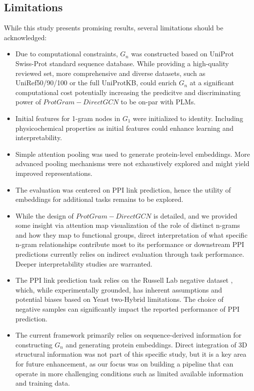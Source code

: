 \documentclass[utf8]{FrontiersinHarvard}
\begin{document}
	\subsection{Limitations}
	While this study presents promising results, several limitations should be acknowledged:
	\begin{itemize}
		\item Due to computational constraints, $G_{n}$ was constructed based on UniProt Swiss-Prot standard sequence database. While providing a high-quality reviewed set, more comprehensive and diverse datasets, such as UniRef50/90/100 or the full UniProtKB, could enrich $G_{n}$ at a significant computational cost potentially increasing the predicitve and discriminating power of $ProtGram-DirectGCN$ to be on-par with PLMs.
		\item Initial features for 1-gram nodes in $G_{1}$ were initialized to identity. Including physicochemical properties as initial features could enhance learning and interpretability.
		\item Simple attention pooling was used to generate protein-level embeddings. More advanced pooling mechanisms were not exhaustively explored and might yield improved representations.
		\item The evaluation was centered on PPI link prediction, hence the utility of embeddings for additional tasks remains to be explored.
		\item While the design of $ProtGram-DirectGCN$ is detailed, and we provided some insight via attention map visualization of the role of distinct n-grams and how they map to functional groups, direct interpretation of what specific n-gram relationships contribute most to its performance or downstream PPI predictions currently relies on indirect evaluation through task performance. Deeper interpretability studies are warranted.
		\item The PPI link prediction task relies on the Russell Lab negative dataset \cite{trabuco_negativeproteinprotein_2012}, which, while experimentally grounded, has inherent assumptions and potential biases based on Yeast two-Hybrid limitations. The choice of negative samples can significantly impact the reported performance of PPI prediction.
		\item The current framework primarily relies on sequence-derived information for constructing $G_{n}$ and generating protein embeddings. Direct integration of 3D structural information was not part of this specific study, but it is a key area for future enhancement, as our focus was on building a pipeline that can operate in more challenging conditions such as limited available information and training data.
	\end{itemize}
	
\end{document}
